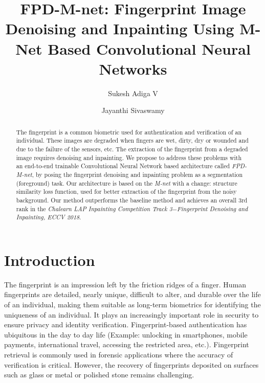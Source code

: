 \documentclass{llncs}
\begin{document}
\title{FPD-M-net: Fingerprint Image Denoising and Inpainting Using M-Net Based Convolutional Neural Networks}

\author{Sukesh Adiga V \and Jayanthi Sivaswamy}

\maketitle              %
%
\begin{abstract}
The fingerprint is a common biometric used for authentication and verification of an individual. These images are degraded when fingers are wet, dirty, dry or wounded and due to the failure of the sensors, etc. The extraction of the fingerprint from a degraded image requires denoising and inpainting. We propose to address these problems with an end-to-end trainable Convolutional Neural Network based architecture called \textit{FPD-M-net}, by posing the fingerprint denoising and inpainting problem as a segmentation (foreground) task. Our architecture is based on the \textit{M-net} with a change: structure similarity loss function, used for better extraction of the fingerprint from the noisy background. Our method outperforms the baseline method and achieves an overall 3rd rank in the \textit{Chalearn LAP Inpainting Competition Track 3$ - $Fingerprint Denoising and Inpainting, ECCV 2018}.


\end{abstract}


\section{Introduction}
\label{sec:introduction}
The fingerprint is an impression left by the friction ridges of a finger. Human fingerprints are detailed, nearly unique, difficult to alter, and durable over the life of an individual, making them suitable as long-term biometrics for identifying the uniqueness of an individual. It plays an increasingly important role in security to ensure privacy and identity verification. Fingerprint-based authentication has ubiquitous in the day to day life (Example: unlocking in smartphones, mobile payments, international travel, accessing the restricted area, etc.). Fingerprint retrieval is commonly used in forensic applications where the accuracy of verification is critical. However, the recovery of fingerprints deposited on surfaces such as glass or metal or polished stone remains challenging.
\end{document}

